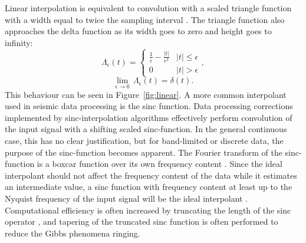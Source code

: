Linear interpolation is equivalent to convolution with a scaled triangle function with a width equal to twice the sampling interval \citep{harlan82}.
The triangle function also approaches the delta function as its width goes to zero and height goes to infinity:
\begin{equation}
	\label{eq:triangle}
	\Lambda_{\epsilon} \left( t \right) = \left\{
	\begin{array}{cc}
	 \frac{1}{\epsilon} - \frac{|t|}{\epsilon^2} & |t| \leq \epsilon \\
	 0 & |t| > \epsilon 
	\end{array}
	\right.,
\end{equation} 
\begin{equation}
	\label{eq:delta_triangle}
	\lim_{\epsilon \to 0} \, \Lambda_{\epsilon} \left( t \right) = \delta \left( t \right).
\end{equation} 
This behaviour can be seen in Figure~\ref{fig:linear}.  
A more common interpolant used in seismic data processing is the sinc function.
Data processing corrections implemented by sinc-interpolation algorithms effectively perform convolution of the input signal with a shifting scaled sinc-function.
In the general continuous case, this has no clear justification, but for band-limited or discrete data, the purpose of the sinc-function becomes apparent.
The Fourier transform of the sinc-function is a boxcar function over its own frequency content \citep{harlan82}.
Since the ideal interpolant should not affect the frequency content of the data while it estimates an intermediate value, a sinc function with frequency content at least up to the Nyquist frequency of the input signal will be the ideal interpolant \citep{harlan82}.
Computational efficiency is often increased by truncating the length of the sinc operator \citep{harlan82}, and tapering of the truncated sinc function is often performed \citep{rosenbaum_boudreaux81} to reduce the Gibbs phenomena ringing.     

